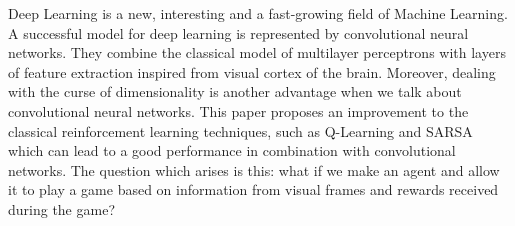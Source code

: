 
Deep Learning is a new, interesting and a fast-growing field of Machine Learning. A successful model for deep learning is represented by convolutional neural networks. They combine the classical model of multilayer perceptrons with layers of feature extraction inspired from visual cortex of the brain. Moreover, dealing with the curse of dimensionality is another advantage when we talk about convolutional neural networks. This paper proposes an improvement to the classical reinforcement learning techniques, such as Q-Learning and SARSA which can lead to a good performance in combination with convolutional networks. The question which arises is this: what if we make an agent and allow it to play a game based on information from visual frames and rewards received during the game?
